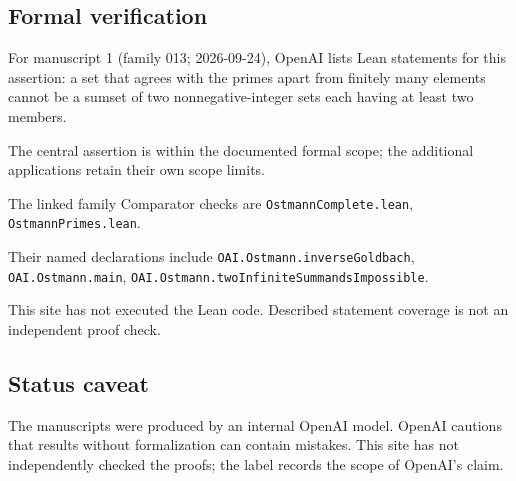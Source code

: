 \documentclass[11pt]{article}
\begin{document}
\subsection{Formal verification}
For manuscript 1 (family 013; 2026-09-24), OpenAI lists Lean statements for this assertion: a set that agrees with the primes apart from finitely many elements cannot be a sumset of two nonnegative-integer sets each having at least two members.

The central assertion is within the documented formal scope; the additional applications retain their own scope limits.

The linked family Comparator checks are \texttt{OstmannComplete.lean}, \texttt{OstmannPrimes.lean}.

Their named declarations include \texttt{OAI.Ostmann.inverseGoldbach}, \texttt{OAI.Ostmann.main}, \texttt{OAI.Ostmann.twoInfiniteSummandsImpossible}.

This site has not executed the Lean code. Described statement coverage is not an independent proof check.

\subsection{Status caveat}
The manuscripts were produced by an internal OpenAI model. OpenAI cautions that results without formalization can contain mistakes. This site has not independently checked the proofs; the label records the scope of OpenAI's claim.
\end{document}
